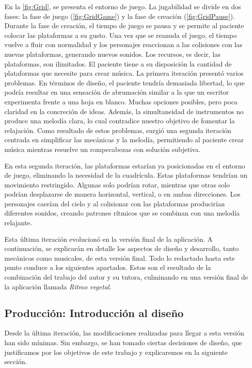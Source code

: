 En la \autoref{fig:Grid}, se presenta el entorno de juego. La jugabilidad se divide en dos fases: la fase de juego (\autoref{fig:GridGame}) y la fase de creación (\autoref{fig:GridPause}). Durante la fase de creación, el tiempo de juego se pausa y se permite al paciente colocar las plataformas a su gusto. Una vez que se reanuda el juego, el tiempo vuelve a fluir con normalidad y los personajes reaccionan a las colisiones con las nuevas plataformas, generando nuevos sonidos. Los recursos, es decir, las plataformas, son ilimitados. El paciente tiene a su disposición la cantidad de plataformas que necesite para crear música. La primera iteración presentó varios problemas. En términos de diseño, el paciente tendría demasiada libertad, lo que podría resultar en una sensación de abrumación similar a la que un escritor experimenta frente a una hoja en blanco. Muchas opciones posibles, pero poca claridad en la concreción de ideas. Además, la simultaneidad de instrumentos no produce una melodía clara, lo cual contradice nuestro objetivo de fomentar la relajación. Como resultado de estos problemas, surgió una segunda iteración centrada en simplificar las mecánicas y la melodía, permitiendo al paciente crear música mientras resuelve un rompecabezas con solución subjetiva.

En esta segunda iteración, las plataformas estarían ya posicionadas en el entorno de juego, eliminando la necesidad de la cuadrícula. Estas plataformas tendrían un movimiento restringido. Algunas solo podrían rotar, mientras que otras solo podrían desplazarse de manera horizontal, vertical, o en ambas direcciones. Los personajes caerían del cielo y al colisionar con las plataformas producirían diferentes sonidos, creando patrones rítmicos que se combinan con una melodía relajante. 

Esta última iteración evolucionó en la versión final de la aplicación. A continuación, se explicarán en detalle los aspectos de diseño y desarrollo, tanto mecánicos como musicales, de esta versión final. Todo lo redactado hasta este punto conduce a los siguientes apartados. Estos son el resultado de la combinación del trabajo del autor y su tutora, culminando en una versión final de la aplicación llamada \textit{Ritmo vegetal}.

\subsection{Producción: Introducción al diseño}

Desde la última iteración, las modificaciones realizadas para llegar a esta versión han sido mínimas. Sin embargo, se han tomado ciertas decisiones de diseño, que justificamos por los objetivos de este trabajo y explicaremos en la siguiente sección.


